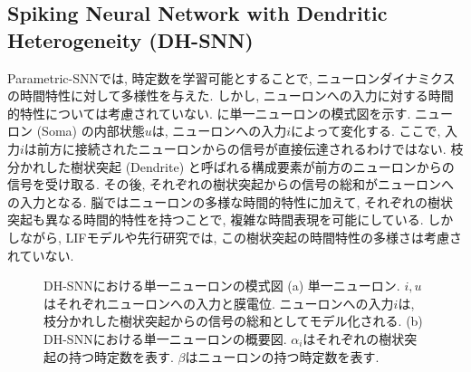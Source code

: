 \subsection{Spiking Neural Network with Dendritic Heterogeneity (DH-SNN)}
Parametric-SNNでは, 時定数を学習可能とすることで, ニューロンダイナミクスの時間特性に対して多様性を与えた.
しかし, ニューロンへの入力に対する時間的特性については考慮されていない.
に単一ニューロンの模式図を示す.
ニューロン (Soma) の内部状態$u$は, ニューロンへの入力$i$によって変化する.
ここで, 入力$i$は前方に接続されたニューロンからの信号が直接伝達されるわけではない.
枝分かれした樹状突起 (Dendrite) と呼ばれる構成要素が前方のニューロンからの信号を受け取る.
その後, それぞれの樹状突起からの信号の総和がニューロンへの入力となる.
脳ではニューロンの多様な時間的特性に加えて, それぞれの樹状突起も異なる時間的特性を持つことで, 複雑な時間表現を可能にしている.
しかしながら, LIFモデルや先行研究では, この樹状突起の時間特性の多様さは考慮されていない.
\begin{figure}
    \centering

    \parbox{1.0\textwidth}{
        \centering

        \begin{minipage}{0.42325\textwidth}
            
            \label{fig:single:neuron}
        \end{minipage}
        \hspace{0.02\textwidth}
        \begin{minipage}{0.477\textwidth}
            
            \label{fig:dhsnn}
        \end{minipage}

        \caption[DH-SNNにおける単一ニューロンの模式図]{
            DH-SNNにおける単一ニューロンの模式図 \cite{dhsnn}
            (a) 単一ニューロン. $i, u$はそれぞれニューロンへの入力と膜電位. 
            ニューロンへの入力$i$は, 枝分かれした樹状突起からの信号の総和としてモデル化される.
            (b) DH-SNNにおける単一ニューロンの概要図.
            $\alpha_i$はそれぞれの樹状突起の持つ時定数を表す.
            $\beta$はニューロンの持つ時定数を表す.
        }
    }


\end{figure}

